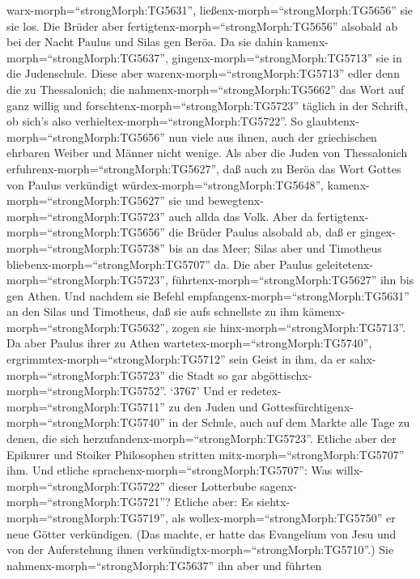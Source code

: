 warx-morph=``strongMorph:TG5631'', ließenx-morph=``strongMorph:TG5656''
sie sie los.  Die Brüder aber
fertigtenx-morph=``strongMorph:TG5656'' alsobald ab bei der Nacht Paulus
und Silas gen Beröa. Da sie dahin kamenx-morph=``strongMorph:TG5637'',
gingenx-morph=``strongMorph:TG5713'' sie in die Judenschule.
 Diese aber warenx-morph=``strongMorph:TG5713'' edler denn
die zu Thessalonich; die nahmenx-morph=``strongMorph:TG5662'' das Wort
auf ganz willig und forschtenx-morph=``strongMorph:TG5723'' täglich in
der Schrift, ob sich's also verhieltex-morph=``strongMorph:TG5722''.
 So glaubtenx-morph=``strongMorph:TG5656'' nun viele aus
ihnen, auch der griechischen ehrbaren Weiber und Männer nicht wenige.
 Als aber die Juden von Thessalonich
erfuhrenx-morph=``strongMorph:TG5627'', daß auch zu Beröa das Wort
Gottes von Paulus verkündigt würdex-morph=``strongMorph:TG5648'',
kamenx-morph=``strongMorph:TG5627'' sie und
bewegtenx-morph=``strongMorph:TG5723'' auch allda das Volk.
 Aber da fertigtenx-morph=``strongMorph:TG5656'' die Brüder
Paulus alsobald ab, daß er gingex-morph=``strongMorph:TG5738'' bis an
das Meer; Silas aber und Timotheus bliebenx-morph=``strongMorph:TG5707''
da.  Die aber Paulus
geleitetenx-morph=``strongMorph:TG5723'',
führtenx-morph=``strongMorph:TG5627'' ihn bis gen Athen. Und nachdem sie
Befehl empfangenx-morph=``strongMorph:TG5631'' an den Silas und
Timotheus, daß sie aufs schnellste zu ihm
kämenx-morph=``strongMorph:TG5632'', zogen sie
hinx-morph=``strongMorph:TG5713''.  Da aber Paulus ihrer zu
Athen wartetex-morph=``strongMorph:TG5740'',
ergrimmtex-morph=``strongMorph:TG5712'' sein Geist in ihm, da er
sahx-morph=``strongMorph:TG5723'' die Stadt so gar
abgöttischx-morph=``strongMorph:TG5752''.  `3767' Und er
redetex-morph=``strongMorph:TG5711'' zu den Juden und
Gottesfürchtigenx-morph=``strongMorph:TG5740'' in der Schule, auch auf
dem Markte alle Tage zu denen, die sich
herzufandenx-morph=``strongMorph:TG5723''.  Etliche aber
der Epikurer und Stoiker Philosophen stritten
mitx-morph=``strongMorph:TG5707'' ihm. Und etliche
sprachenx-morph=``strongMorph:TG5707'': Was
willx-morph=``strongMorph:TG5722'' dieser Lotterbube
sagenx-morph=``strongMorph:TG5721''? Etliche aber: Es
siehtx-morph=``strongMorph:TG5719'', als
wollex-morph=``strongMorph:TG5750'' er neue Götter verkündigen. (Das
machte, er hatte das Evangelium von Jesu und von der Auferstehung ihnen
verkündigtx-morph=``strongMorph:TG5710''.)  Sie
nahmenx-morph=``strongMorph:TG5637'' ihn aber und führten
